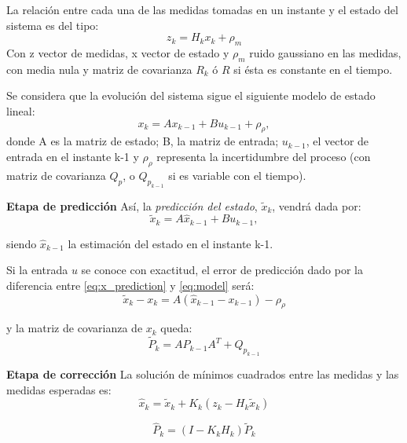 La relación entre cada una de las medidas tomadas en un instante y el estado del sistema es del tipo:
\begin{equation}\label{eq:measurement}
   z_{k} = H_{k}x_{k}+\rho_{m}
\end{equation}
Con z vector de medidas, x vector de estado y $\rho_{m}$ ruido gaussiano en las medidas, con media nula y matriz de covarianza $R_{k}$ ó $R$ si ésta es constante en el tiempo.

Se considera que la evolución del sistema sigue el siguiente modelo de estado lineal:
\begin{equation}\label{eq:model}
    x_{k} = Ax_{k-1}+Bu_{k-1}+\rho_{\rho},
\end{equation}
donde A es la matriz de estado; B, la matriz de entrada; $u_{k-1}$, el vector de entrada en el instante k-1 y $\rho_{\rho}$ representa la incertidumbre del proceso (con matriz de covarianza $Q_{p}$, o $Q_{p_{k-1}}$ si es variable con el tiempo).


\textbf{Etapa de predicción}
Así, la \emph{predicción del estado}, $\tilde{x}_{k}$, vendrá dada por:
\begin{equation}\label{eq:x_prediction}
    \tilde{x}_{k} = A\hat{x}_{k-1}+Bu_{k-1},
\end{equation}

siendo $\hat{x}_{k-1}$ la estimación del estado en el instante k-1.

Si la entrada $u$ se conoce con exactitud, el error de predicción dado por la diferencia entre \ref{eq:x_prediction} y \ref{eq:model} será:
\begin{equation}\label{eq:prediction_error}
    \tilde{x}_{k}-x_{k} = A(\hat{x}_{k-1}-x_{k-1})- \rho_{\rho}
\end{equation}

y la matriz de covarianza de $x_{k}$ queda:
\begin{equation}\label{eq:P_prediction}
    \tilde{P}_{k} = A\hat{P}_{k-1}A^{T}+Q_{p_{k-1}}
\end{equation}


\textbf{Etapa de corrección}
La solución de mínimos cuadrados entre las medidas y las medidas esperadas es:
\begin{equation}\label{eq:x_estimation}
    \hat{x}_{k} = \tilde{x}_{k}+K_{k}(z_{k}-H_{k}\tilde{x}_{k})
\end{equation}

\begin{equation}\label{eq:P_estimation}
    \hat{P}_{k} = (I-K_{k}H_{k})\tilde{P}_{k}
\end{equation}

